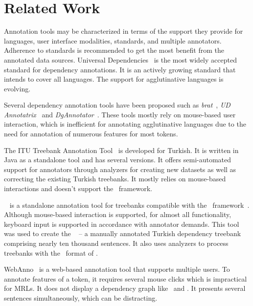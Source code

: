 \section{Related Work}
\label{sec:related}

Annotation tools may be characterized in terms of the support they provide for languages, user interface modalities, standards, and multiple annotators.
Adherence to standards is recommended to get the most benefit from the annotated data sources.
Universal Dependencies~\cite{UD} is the most widely accepted standard for dependency annotations.
It is an actively growing standard that intends to cover all languages.
The support for agglutinative languages is evolving.

Several dependency annotation tools have been proposed such as \textit{brat}~\cite{brat}, \textit{UD Annotatrix}~\cite{tyers-etal:2018} and \textit{DgAnnotator}~\cite{dgannotator,UD-tools}.
These tools mostly rely on mouse-based user interaction, which is inefficient for annotating agglutinative languages due to the need for annotation of numerous features for most tokens.

The ITU Treebank Annotation Tool~\cite{pamay-etal-2015-annotation} is developed for Turkish.
It is written in Java as a standalone tool and has several versions.
It offers semi-automated support for annotators through analyzers for creating new datasets as well as correcting the existing Turkish treebanks.
It mostly relies on mouse-based interactions and doesn't support the \ud\ framework.

\boatvone~\cite{turk-etal-2019-turkish} is a standalone annotation tool for treebanks compatible with the \ud\ framework~\cite{UD}.
Although mouse-based interaction is supported, for almost all functionality, keyboard input is supported in accordance with annotator demands.
This tool was used to create the \bountreebank~\cite{turk2021resources,UD-Boun-Treebank} -- a manually annotated Turkish dependency treebank comprising nearly ten thousand sentences.
It also uses analyzers to process treebanks with the \conllu\ format of \ud.

WebAnno~\cite{webanno} is a web-based annotation tool that supports multiple users.
To annotate features of a token, it requires several mouse clicks which is impractical for MRLs.
It does not display a dependency graph like \boatvone\ and \boatvtwo.
It presents several sentences simultaneously, which can be distracting.

